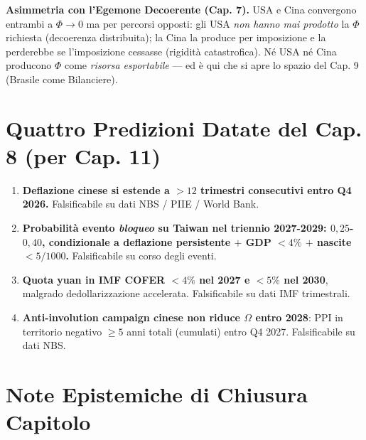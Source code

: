 \Hypoth{} \textbf{Asimmetria con l'Egemone Decoerente (Cap. 7).} USA e
Cina convergono entrambi a \(\Phi \to 0\) ma per percorsi opposti: gli
USA \emph{non hanno mai prodotto} la \(\Phi\) richiesta (decoerenza
distribuita); la Cina la produce per imposizione e la perderebbe se
l'imposizione cessasse (rigidità catastrofica). Né USA né Cina producono
\(\Phi\) come \emph{risorsa esportabile} --- ed è qui che si apre lo
spazio del Cap. 9 (Brasile come Bilanciere).



\section{Quattro Predizioni Datate del Cap. 8 (per Cap.
11)}\label{quattro-predizioni-datate-del-cap.-8-per-cap.-11}

\begin{enumerate}
\def\labelenumi{\arabic{enumi}.}
\tightlist
\item
  \textbf{Deflazione cinese si estende a \(> 12\) trimestri consecutivi
  entro Q4 2026.} Falsificabile su dati NBS / PIIE / World Bank.
\item
  \textbf{Probabilità evento \emph{bloqueo} su Taiwan nel triennio
  2027-2029: \(0{,}25\)-\(0{,}40\), condizionale a deflazione
  persistente \(+\) GDP \(< 4\%\) \(+\) nascite \(< 5/1000\).}
  Falsificabile su corso degli eventi.
\item
  \textbf{Quota yuan in IMF COFER \(< 4\%\) nel 2027 e \(< 5\%\) nel
  2030}, malgrado dedollarizzazione accelerata. Falsificabile su dati
  IMF trimestrali.
\item
  \textbf{Anti-involution campaign cinese non riduce \(\Omega\) entro
  2028}: PPI in territorio negativo \(\geq 5\) anni totali (cumulati)
  entro Q4 2027. Falsificabile su dati NBS.
\end{enumerate}



\section{Note Epistemiche di Chiusura
Capitolo}\label{note-epistemiche-di-chiusura-capitolo}


